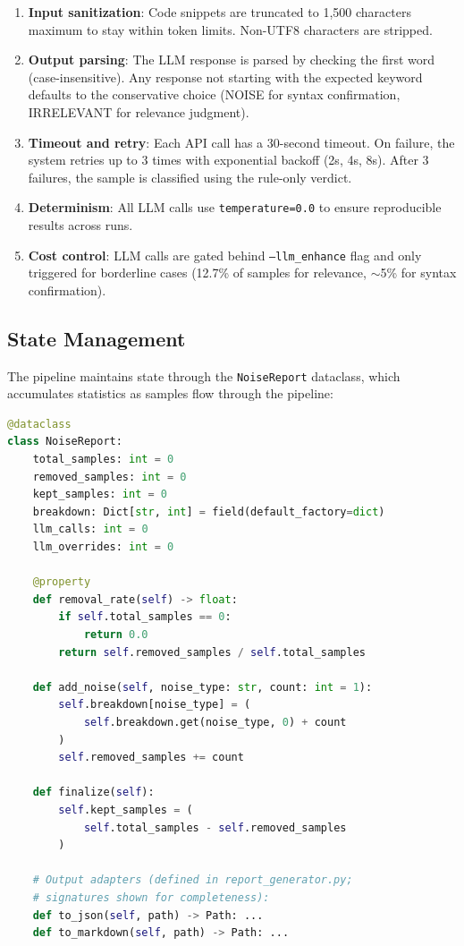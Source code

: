 \documentclass[acmlarge,nonacm,screen]{acmart}
\begin{document}
\begin{enumerate}
    \item \textbf{Input sanitization}: Code snippets are truncated to 1,500 characters maximum to stay within token limits. Non-UTF8 characters are stripped.
    \item \textbf{Output parsing}: The LLM response is parsed by checking the first word (case-insensitive). Any response not starting with the expected keyword defaults to the conservative choice (NOISE for syntax confirmation, IRRELEVANT for relevance judgment).
    \item \textbf{Timeout and retry}: Each API call has a 30-second timeout. On failure, the system retries up to 3 times with exponential backoff (2s, 4s, 8s). After 3 failures, the sample is classified using the rule-only verdict.
    \item \textbf{Determinism}: All LLM calls use \texttt{temperature=0.0} to ensure reproducible results across runs.
    \item \textbf{Cost control}: LLM calls are gated behind \texttt{--llm\_enhance} flag and only triggered for borderline cases (12.7\% of samples for relevance, $\sim$5\% for syntax confirmation).
\end{enumerate}

\subsection{State Management}

The pipeline maintains state through the \texttt{NoiseReport} dataclass, which accumulates statistics as samples flow through the pipeline:

\begin{lstlisting}[language=Python,caption={NoiseReport state management}]
@dataclass
class NoiseReport:
    total_samples: int = 0
    removed_samples: int = 0
    kept_samples: int = 0
    breakdown: Dict[str, int] = field(default_factory=dict)
    llm_calls: int = 0
    llm_overrides: int = 0

    @property
    def removal_rate(self) -> float:
        if self.total_samples == 0:
            return 0.0
        return self.removed_samples / self.total_samples

    def add_noise(self, noise_type: str, count: int = 1):
        self.breakdown[noise_type] = (
            self.breakdown.get(noise_type, 0) + count
        )
        self.removed_samples += count

    def finalize(self):
        self.kept_samples = (
            self.total_samples - self.removed_samples
        )

    # Output adapters (defined in report_generator.py;
    # signatures shown for completeness):
    def to_json(self, path) -> Path: ...
    def to_markdown(self, path) -> Path: ...
\end{lstlisting}
\end{document}
